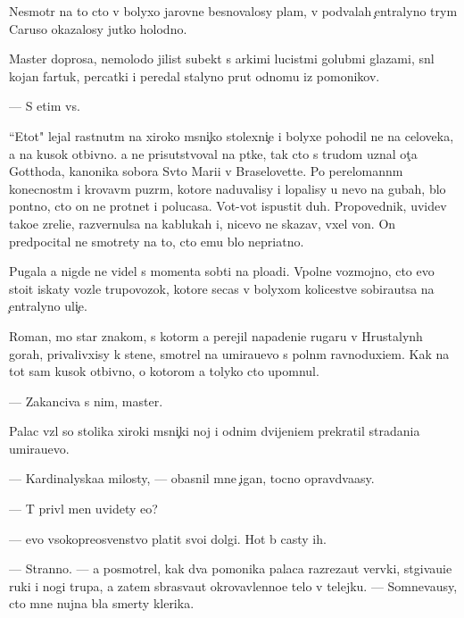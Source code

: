 \documentclass[10pt]{book}
\begin{document}
Nesmotr{\ia} na to cto v bolyxo{\y} jarovne besnovalosy plam{\ia}, v podvalah {\c}entralyno{\y} t{\io}rym{\yi} Caruso okazalosy jutko holodno.

Master doprosa, nemolodo{\y} jilist{\yi}{\y} sub{\y}ekt s {\y}arkimi lucist{\yi}mi golub{\yi}mi glaza\-mi, sn{\ia}l kojan{\yi}{\y} fartuk, percatki i peredal stalyno{\y} prut odnomu iz pomo{\x}nikov.

— S etim vs{\e}.

``Etot" lejal rast{\ia}nut{\yi}m na xiroko{\y} m{\ia}sni{\c}ko{\y} stolexni{\c}e i bolyxe pohodil ne na celoveka, a na kusok otbivno{\y}. {\Y}a ne prisutstvoval na p{\yi}tke, tak cto s trudom uznal ot{\c}a Gotthoda, kanonika sobora Sv{\ia}to{\y} Mari{\y}i v Braselovette. Po perelomann{\yi}m konecnost{\ia}m i krovav{\yi}m puz{\yi}r{\ia}m, ko\-to\-r{\yi}\-{\y}e naduvalisy i lopalisy u nevo na gubah, b{\yi}lo pon{\ia}tno, cto on ne prot{\ia}net i polucasa. Vot-vot ispustit duh. Pro\-po\-ved\-nik, uvidev tako{\y}e zreli{\x}e, razvernulsa na kablukah i, nicevo ne skazav, v{\yi}xel von. On predpocital ne smotrety na to, cto {\y}emu b{\yi}lo nepri{\y}atno.

Pugala {\y}a nigde ne videl s momenta sob{\yi}ti{\y} na plo{\x}adi. Vpolne vozmojno, cto {\y}evo stoit iskaty voz\-le trupovozok, ko\-to\-r{\yi}\-{\y}e se{\y}cas v bolyxom kolicestve sobira{\y}utsa na {\c}entralyno{\y} uli{\c}e.

Roman, mo{\y} star{\yi}{\y} znakom{\yi}{\y}, s kotor{\yi}m {\y}a perejil napadeni{\y}e rugaru v Hrus\-taly\-n{\yi}h gorah, privalivxisy k stene, smotrel na umira{\y}u{\x}evo s poln{\yi}m ravno\-duxi\-{\y}em. Kak na tot sam{\yi}{\y} kusok otbivno{\y}, o kotorom {\y}a tolyko cto upom{\ia}nul.

— Zakanciva{\y} s nim, master.

Palac vz{\ia}l so stolika xiroki{\y} m{\ia}sni{\c}ki{\y} noj i odnim dvijeni{\y}em prekratil stra\-da\-ni\-{\y}a umira{\y}u{\x}evo.

— Kardinalyska{\y}a milosty, — ob{\y}asnil mne {\c}igan, tocno opravd{\yi}va{\y}asy.

— T{\yi} priv{\e}l men{\ia} uvidety {\y}e{\y}o?

— {\Y}evo v{\yi}sokopreosv{\ia}{\x}enstvo platit svo{\y}i dolgi. Hot{\ia} b{\yi} casty ih.

— Stranno. — {\Y}a posmotrel, kak dva pomo{\x}nika palaca razreza{\y}ut ver{\e}vki, st{\ia}gi\-va\-{\y}u\-{\x}i\-{\y}e ruki i nogi trupa, a zatem sbras{\yi}va{\y}ut okrovavlenno{\y}e telo v telejku. — Somneva{\y}usy, cto mne nujna b{\yi}la smerty klerika.
\end{document}
